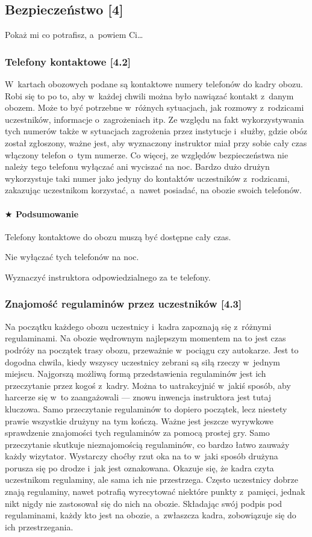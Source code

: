 \documentclass[a5paper,10pt,titlepage,twoside]{article}
\newcommand*{\thecheckbox}{\hss$\Box$} %
\newenvironment*{checklist}
{\list{}{%
\renewcommand*{\makelabel}[1]{\thecheckbox}}}
{\endlist}
\begin{document}
\subsection{Bezpieczeństwo [4]}
Pokaż mi co potrafisz, a~powiem Ci\ldots
\subsubsection{Telefony kontaktowe [4.2]}
W~kartach obozowych podane są kontaktowe numery telefonów do kadry obozu. Robi się to po to, aby w~każdej chwili można było nawiązać kontakt z~danym obozem. Może to być potrzebne w~różnych sytuacjach, jak rozmowy z~rodzicami uczestników, informacje o~zagrożeniach itp. Ze względu na fakt wykorzystywania tych numerów także w sytuacjach zagrożenia przez instytucje i~służby, gdzie obóz został zgłoszony, ważne jest, aby wyznaczony instruktor miał przy sobie cały czas włączony telefon o~tym numerze. Co więcej, ze względów bezpieczeństwa nie należy tego telefonu wyłączać ani wyciszać na noc. Bardzo dużo drużyn wykorzystuje taki numer jako jedyny do kontaktów uczestników z~rodzicami, zakazując uczestnikom korzystać, a~nawet posiadać, na obozie swoich telefonów.
\paragraph{$\bigstar$ Podsumowanie}
\begin{checklist}
\item Telefony kontaktowe do obozu muszą być dostępne cały czas.
\item Nie wyłączać tych telefonów na noc.
\item Wyznaczyć instruktora odpowiedzialnego za te telefony.
\end{checklist}
\subsubsection{Znajomość regulaminów przez uczestników [4.3]\label{regulaminy}}
Na początku każdego obozu uczestnicy i~kadra zapoznają się z~różnymi regulaminami. Na obozie wędrownym najlepszym momentem na to jest czas podróży na początek trasy obozu, przeważnie w~pociągu czy autokarze. Jest to dogodna chwila, kiedy wszyscy uczestnicy zebrani są siłą rzeczy w~jednym miejscu. Najgorszą możliwą formą przedstawienia regulaminów jest ich przeczytanie przez kogoś z~kadry. Można to uatrakcyjnić w~jakiś sposób, aby harcerze się w~to zaangażowali --- znowu inwencja instruktora jest tutaj kluczowa. Samo przeczytanie regulaminów to dopiero początek, lecz niestety prawie wszystkie drużyny na tym kończą. Ważne jest jeszcze wyrywkowe sprawdzenie znajomości tych regulaminów za pomocą prostej gry. Samo przeczytanie skutkuje nieznajomością regulaminów, co bardzo łatwo zauważy każdy wizytator. Wystarczy choćby rzut oka na to w~jaki sposób drużyna porusza się po drodze i~jak jest oznakowana. Okazuje się, że kadra czyta uczestnikom regulaminy, ale sama ich nie przestrzega. Często uczestnicy dobrze znają regulaminy, nawet potrafią wyrecytować niektóre punkty z~pamięci, jednak nikt nigdy nie zastosował się do nich na obozie. Składając swój podpis pod regulaminami, każdy kto jest na obozie, a~zwłaszcza kadra, zobowiązuje się do ich przestrzegania.
\end{document}
